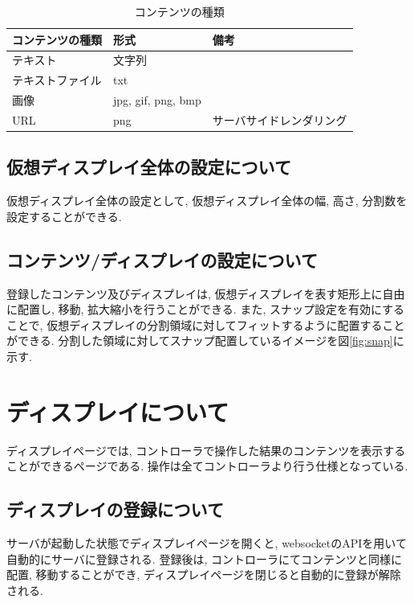 \documentclass[a4paper,10pt,oneside]{jsbook}
\begin{document}
\begin{table}[htbp]
\begin{center}
\caption{コンテンツの種類}
\label{contentstype}
\begin{tabular}{|l|l|l|}
\hline
コンテンツの種類 & 形式 & 備考 \\
\hline
\hline
テキスト & 文字列 & \\
\hline
テキストファイル & txt & \\
\hline
画像	& jpg, gif, png, bmp & \\
\hline
URL	& png & サーバサイドレンダリング \\
\hline

\end{tabular}
\end{center}
\end{table}

\section{仮想ディスプレイ全体の設定について}
仮想ディスプレイ全体の設定として, 仮想ディスプレイ全体の幅, 高さ, 分割数を設定することができる. 

\section{コンテンツ/ディスプレイの設定について}
登録したコンテンツ及びディスプレイは, 仮想ディスプレイを表す矩形上に自由に配置し, 移動, 拡大縮小を行うことができる. また, スナップ設定を有効にすることで, 仮想ディスプレイの分割領域に対してフィットするように配置することができる.
分割した領域に対してスナップ配置しているイメージを図\ref{fig:snap}に示す. 



\chapter{ディスプレイについて}
ディスプレイページでは, コントローラで操作した結果のコンテンツを表示することができるページである. 操作は全てコントローラより行う仕様となっている.

\section{ディスプレイの登録について}
サーバが起動した状態でディスプレイページを開くと, websocketのAPIを用いて自動的にサーバに登録される. 登録後は, コントローラにてコンテンツと同様に配置, 移動することができ, ディスプレイページを閉じると自動的に登録が解除される. 
\end{document}
